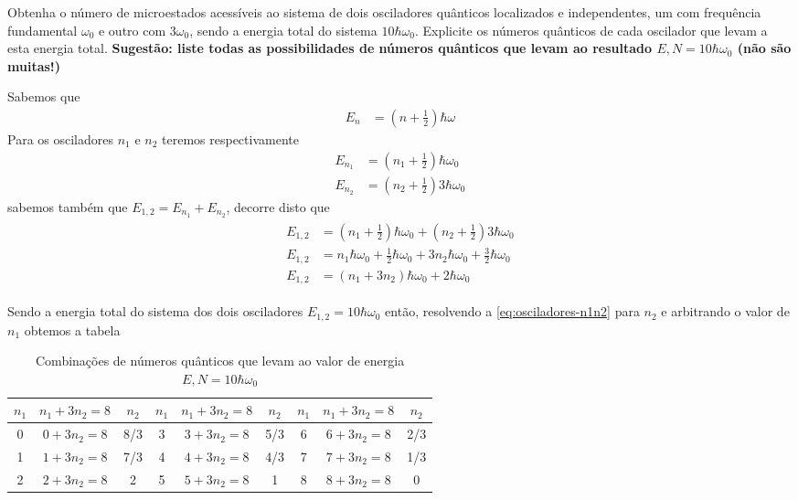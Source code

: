 \begin{prob}
	Obtenha o número de microestados acessíveis ao sistema de dois osciladores quânticos
	localizados e independentes, um com frequência fundamental $\omega_0$ e outro com $3\omega_0$, sendo a energia
	total do sistema $10\hbar \omega_0$. Explicite os números quânticos de cada oscilador que levam a esta
	energia total. \textbf{Sugestão: liste todas as possibilidades de números quânticos que levam ao resultado $E,N=10\hbar \omega_0$  (não são muitas!)}
	\begin{sol}
		Sabemos que
		\begin{align}
			E_n&=\left(n+\frac{1}{2}\right)\hbar\omega
		\end{align}
		Para os osciladores $n_1$ e $n_2$ teremos respectivamente
		\begin{align}
			E_{n_1}&=\left(n_1+\frac{1}{2}\right)\hbar\omega_0\\
			E_{n_2}&=\left(n_2+\frac{1}{2}\right)3\hbar\omega_0
		\end{align}
		sabemos também que $E_{1,2}=E_{n_1}+E_{n_2}$, decorre disto que
		\begin{align}
			\label{eq:osciladores-n1n2}
			\begin{split}
				E_{1,2}&=\left(n_1+\frac{1}{2}\right)\hbar\omega_0+\left(n_2+\frac{1}{2}\right)3\hbar\omega_0\\
				E_{1,2}&=n_1\hbar\omega_0+\frac{1}{2}\hbar\omega_0+3n_2\hbar\omega_0+\frac{3}{2}\hbar\omega_0\\
				E_{1,2}&=\left(n_1+3n_2\right)\hbar\omega_0+2\hbar\omega_0
			\end{split}
		\end{align}

		Sendo a energia total do sistema dos dois osciladores $E_{1,2}=10\hbar\omega_0$ então, resolvendo a \eqref{eq:osciladores-n1n2} para $n_2$ e arbitrando o valor de $n_1$ obtemos a tabela
\begin{table}[!ht]
	\centering
	\begin{tabular}{|c|c|c|c|c|c|c|c|c|}
	\hline
	\textbf{$n_1$} & \textbf{$n_1+3n_2=8$} & \textbf{$n_2$} & \textbf{$n_1$} & \textbf{$n_1+3n_2=8$} & \textbf{$n_2$} & \textbf{$n_1$} & \textbf{$n_1+3n_2=8$} & \textbf{$n_2$} \\ \hline
	0              & $0+3n_2=8$            & 8/3            & 3              & $3+3n_2=8$            & 5/3            & 6              & $6+3n_2=8$            & 2/3            \\ \hline
	1              & $1+3n_2=8$            & 7/3            & 4              & $4+3n_2=8$            & 4/3            & 7              & $7+3n_2=8$            & 1/3            \\ \hline
	2              & $2+3n_2=8$            & 2              & 5              & $5+3n_2=8$            & 1              & 8              & $8+3n_2=8$            & 0              \\ \hline
	\end{tabular}
	\caption{Combinações de números quânticos que levam ao valor de energia $E,N=10\hbar\omega_0$}
	\label{tab:numeros-quanticos}
\end{table}


\end{sol}
\end{prob}
